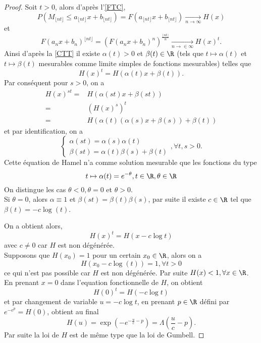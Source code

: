 \documentclass[10p,a4paper,reqno,titlepage]{report}
\begin{document}
\begin{proof}
	Soit $t >0$, alors d'après l'\autoref{FTC},
	$$P(M_{\lfloor nt \rfloor} \leq a_{\lfloor nt \rfloor} x + b_{\lfloor nt \rfloor}) = F(a_{\lfloor nt \rfloor} x + b_{\lfloor nt \rfloor}) \underset{n\to \infty}{\longrightarrow} H(x)$$
	et
	$$F(a_n x +b_n)^{\lfloor nt \rfloor} = \left( F(a_n x +b_n)^n\right)^{\frac{\lfloor nt \rfloor}{n}} \underset{n\to\in\infty}{\longrightarrow} H(x)^t.$$
	Ainsi d'après la \autoref{CTT} il existe $\alpha(t)>0$ et $\beta(t)\in\R$ (tels que $t \mapsto \alpha(t)$ et $t \mapsto \beta(t)$ mesurables comme limite simples de fonctions mesurables) telles que 
	$$ H(x)^t = H(\alpha(t)x +\beta(t)).$$
	Par conséquent pour $s>0$, on a 
	\begin{align*}
		H(x)^{st} = &  H(\alpha(st)x + \beta(st))\\
		= & (H(x)^s )^t \\
		= & H(\alpha(t)(\alpha(s)x +\beta(s))+\beta(t))
	\end{align*}
et par identification, on a 
$$\left\{ \begin{array}{l}
	\alpha(st) = \alpha(s)\alpha(t)\\
	\beta(st)= \alpha(t)\beta(s)+\beta(t)
\end{array}\right. ,\forall t,s >0.$$
Cette équation de Hamel n'a comme solution mesurable que les fonctions du type
$$ t \mapsto \alpha(t)= e^{-\theta}, t \in \R, \theta\in\R$$
On distingue les cas $\theta<0, \theta =0$ et $\theta >0$. \\
Si $\theta =0$, alors $\alpha \equiv 1$ et $\beta(st)=\beta(t)\beta(s)$, par suite il existe $c \in\R$ tel que $\beta(t)=- c \log(t)$.

On a obtient alors,
$$ H(x)^t = H(x -c\log t )$$
avec $c \neq 0$ car $H$ est non dégénérée. \\
Supposons que $H(x_0)= 1 $ pour un certain $x_0 \in \R$, alors on a 
 $$ H(x_0 - c\log(t))= 1 ,\forall t > 0$$
 ce qui n'est pas possible car $H$ est non dégénérée. Par suite $H(x) < 1,\forall x \in \R$.\\
 En prenant $x=0$ dans l'equation fonctionnelle de $H$, on obtient 
 $$ H(0)^t = H(- c\log t)$$
 et par changement de variable $u = - c\log t$, en prenant $p\in\R$ défini par $e^{-e ^p} =H(0)$, obtient au final
 $$H(u)= \exp(-e^{-\tfrac{u}{c}-p}) =\Lambda\left(\frac{u}{c}-p\right).$$
 Par suite la loi de $H$ est de même type que la loi de Gumbell.
\end{proof}
\end{document}
